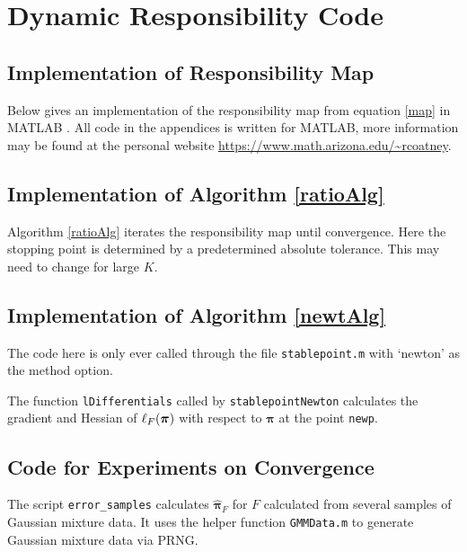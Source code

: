 \renewcommand{\thesubsection}{\Alph{subsection}}

\chapter{Dynamic Responsibility Code}\label{app:DRcode}
\section{Implementation of Responsibility Map}\label{code:map}
Below gives an implementation of the responsibility map from equation \eqref{map} in MATLAB \cite{MATLAB:2020a}. All code in the appendices is written for MATLAB, more information may be found at the personal website \url{https://www.math.arizona.edu/~rcoatney}.



\newpage
\section{Implementation of Algorithm \ref{ratioAlg}}\label{code:ratioAlg}
Algorithm \ref{ratioAlg} iterates the responsibility map until convergence.  Here the stopping point is determined by a predetermined absolute tolerance.  This may need to change for large $K$.


\newpage
\section{Implementation of Algorithm \ref{newtAlg}}\label{code:newtAlg}
The code here is only ever called through the file \verb|stablepoint.m| with `newton' as the method option. 


The function \verb|lDifferentials| called by \verb|stablepointNewton| calculates the gradient and Hessian of \( \ell_{F}({\bm\pi}) \) with respect to \( \bm\pi \) at the point \verb|newp|.

			
\section{Code for Experiments on Convergence}
The script \verb|error_samples| calculates \( \hat{\bm \pi}_F \) for \( F \) calculated from several samples of Gaussian mixture data. It uses the helper function \verb|GMMData.m| to generate Gaussian mixture data via PRNG.

